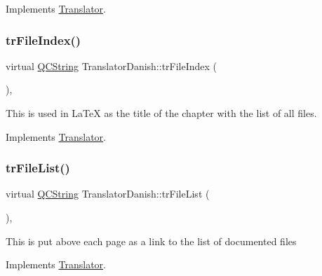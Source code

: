 Implements \mbox{\hyperlink{class_translator}{Translator}}.

\mbox{\label{class_translator_danish_a53c7ef385fcbccb45c3d3f5c285f1fea}} 
\subsubsection{\texorpdfstring{trFileIndex()}{trFileIndex()}}
{\footnotesize\ttfamily virtual \mbox{\hyperlink{class_q_c_string}{Q\+C\+String}} Translator\+Danish\+::tr\+File\+Index (\begin{DoxyParamCaption}{ }\end{DoxyParamCaption})\hspace{0.3cm}{\ttfamily [inline]}, {\ttfamily [virtual]}}

This is used in La\+TeX as the title of the chapter with the list of all files. 

Implements \mbox{\hyperlink{class_translator}{Translator}}.

\mbox{\label{class_translator_danish_a02c7f5a5fbc3f616c001739d76e46dfe}} 
\subsubsection{\texorpdfstring{trFileList()}{trFileList()}}
{\footnotesize\ttfamily virtual \mbox{\hyperlink{class_q_c_string}{Q\+C\+String}} Translator\+Danish\+::tr\+File\+List (\begin{DoxyParamCaption}{ }\end{DoxyParamCaption})\hspace{0.3cm}{\ttfamily [inline]}, {\ttfamily [virtual]}}

This is put above each page as a link to the list of documented files 

Implements \mbox{\hyperlink{class_translator}{Translator}}.

\mbox{\label{class_translator_danish_a74e6926db08ce24de7bc2796ac8d0e68}} 

